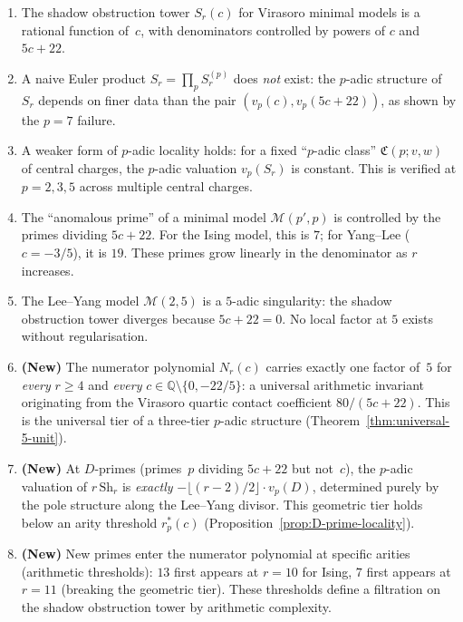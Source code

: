 \documentclass[11pt]{article}
\newcommand{\cM}{\mathcal{M}}
\newcommand{\Q}{\mathbb{Q}}
\begin{document}
\begin{enumerate}[label=\textup{(\arabic*)}]
\item The shadow obstruction tower $S_r(c)$ for Virasoro minimal models is
  a rational function of~$c$, with denominators controlled by
  powers of $c$ and $5c+22$.

\item A naive Euler product $S_r = \prod_p S_r^{(p)}$ does
  \emph{not} exist: the $p$-adic structure of $S_r$ depends on
  finer data than the pair $(v_p(c), v_p(5c+22))$, as shown by
  the $p = 7$ failure.

\item A weaker form of $p$-adic locality holds: for a fixed
  ``$p$-adic class'' $\mathfrak{C}(p; v, w)$ of central charges,
  the $p$-adic valuation $v_p(S_r)$ is constant.  This is
  verified at $p = 2, 3, 5$ across multiple central charges.

\item The ``anomalous prime'' of a minimal model $\cM(p', p)$ is
  controlled by the primes dividing $5c+22$.  For the Ising
  model, this is $7$; for Yang--Lee ($c = -3/5$), it is $19$.
  These primes grow linearly in the denominator as $r$ increases.

\item The Lee--Yang model $\cM(2,5)$ is a $5$-adic singularity:
  the shadow obstruction tower diverges because $5c+22 = 0$.  No local
  factor at $5$ exists without regularisation.

\item \textbf{(New)} The numerator polynomial $N_r(c)$ carries
  exactly one factor of~$5$ for \emph{every} $r \ge 4$ and
  \emph{every} $c \in \Q \setminus \{0, -22/5\}$: a universal
  arithmetic invariant originating from the Virasoro quartic
  contact coefficient $80/(5c{+}22)$.  This is the universal
  tier of a three-tier $p$-adic structure
  (Theorem~\ref{thm:universal-5-unit}).

\item \textbf{(New)} At $D$-primes (primes~$p$ dividing
  $5c + 22$ but not~$c$), the $p$-adic valuation of
  $r\,\mathrm{Sh}_r$ is \emph{exactly}
  $-\lfloor(r{-}2)/2\rfloor \cdot v_p(D)$, determined purely
  by the pole structure along the Lee--Yang divisor.  This
  geometric tier holds below an arity threshold $r_p^*(c)$
  (Proposition~\ref{prop:D-prime-locality}).

\item \textbf{(New)} New primes enter the numerator polynomial
  at specific arities (arithmetic thresholds): $13$ first
  appears at $r = 10$ for Ising, $7$ first appears at $r = 11$
  (breaking the geometric tier).  These thresholds define a
  filtration on the shadow obstruction tower by arithmetic complexity.


\end{enumerate}
\end{document}

